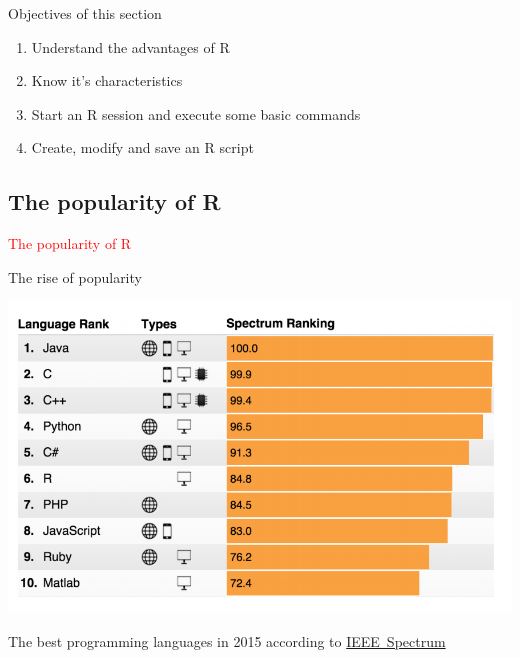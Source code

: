 \documentclass[11pt]{beamer}\usepackage[]{graphicx}\usepackage[]{color}
\begin{document}
\begin{frame}[plain]
\hspace*{-1.0cm}\parbox[t]{\textwidth}{
\begin{block}{Objectives of this section}
\begin{enumerate}
\item Understand the advantages of R
\item Know it's characteristics
\item Start an R session and execute some basic commands
\item Create, modify and save an R script
\end{enumerate}
\end{block}
}
\end{frame}



\subsection{The popularity of R}

\begin{frame}
 \begin{center}
  \Huge{\textcolor{red}{The popularity of R}}
 \end{center}
\end{frame}


\begin{frame}{The rise of popularity}

\vspace{0.1in}

\begin{center}
\includegraphics[scale=0.79]{rankings.png}
\end{center}

\vspace{0.2in}

The best programming languages in 2015 according to \href{http://spectrum.ieee.org/computing/software/the-2015-top-ten-programming-languages}{\mbox{IEEE Spectrum}} \\
\end{frame}
\end{document}
